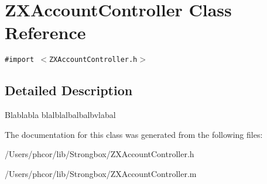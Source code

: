 \hypertarget{interface_z_x_account_controller}{
\section{ZXAccountController Class Reference}
\label{interface_z_x_account_controller}
}
{\tt \#import $<$ZXAccountController.h$>$}



\subsection{Detailed Description}
Blablabla  blalblalbalbalbvlabal 

The documentation for this class was generated from the following files:\begin{CompactItemize}
\item 
/Users/phcor/lib/Strongbox/ZXAccountController.h\item 
/Users/phcor/lib/Strongbox/ZXAccountController.m\end{CompactItemize}
